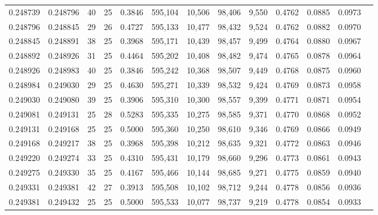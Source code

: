 \begin{tabular}{rrrrrrrrrrrrr}
0.248739 & 0.248796 &    40 &  25 &                                     0.3846 & 595,104 &  10,506 &  98,406 &   9,550 & 0.4762 & 0.0885 & 0.0973 \\
0.248796 & 0.248845 &    29 &  26 &                                     0.4727 & 595,133 &  10,477 &  98,432 &   9,524 & 0.4762 & 0.0882 & 0.0970 \\
0.248845 & 0.248891 &    38 &  25 &                                     0.3968 & 595,171 &  10,439 &  98,457 &   9,499 & 0.4764 & 0.0880 & 0.0967 \\
0.248892 & 0.248926 &    31 &  25 &                                     0.4464 & 595,202 &  10,408 &  98,482 &   9,474 & 0.4765 & 0.0878 & 0.0964 \\
0.248926 & 0.248983 &    40 &  25 &                                     0.3846 & 595,242 &  10,368 &  98,507 &   9,449 & 0.4768 & 0.0875 & 0.0960 \\
0.248984 & 0.249030 &    29 &  25 &                                     0.4630 & 595,271 &  10,339 &  98,532 &   9,424 & 0.4769 & 0.0873 & 0.0958 \\
0.249030 & 0.249080 &    39 &  25 &                                     0.3906 & 595,310 &  10,300 &  98,557 &   9,399 & 0.4771 & 0.0871 & 0.0954 \\
0.249081 & 0.249131 &    25 &  28 &                                     0.5283 & 595,335 &  10,275 &  98,585 &   9,371 & 0.4770 & 0.0868 & 0.0952 \\
0.249131 & 0.249168 &    25 &  25 &                                     0.5000 & 595,360 &  10,250 &  98,610 &   9,346 & 0.4769 & 0.0866 & 0.0949 \\
0.249168 & 0.249217 &    38 &  25 &                                     0.3968 & 595,398 &  10,212 &  98,635 &   9,321 & 0.4772 & 0.0863 & 0.0946 \\
0.249220 & 0.249274 &    33 &  25 &                                     0.4310 & 595,431 &  10,179 &  98,660 &   9,296 & 0.4773 & 0.0861 & 0.0943 \\
0.249275 & 0.249330 &    35 &  25 &                                     0.4167 & 595,466 &  10,144 &  98,685 &   9,271 & 0.4775 & 0.0859 & 0.0940 \\
0.249331 & 0.249381 &    42 &  27 &                                     0.3913 & 595,508 &  10,102 &  98,712 &   9,244 & 0.4778 & 0.0856 & 0.0936 \\
0.249381 & 0.249432 &    25 &  25 &                                     0.5000 & 595,533 &  10,077 &  98,737 &   9,219 & 0.4778 & 0.0854 & 0.0933 \\

\end{tabular}

